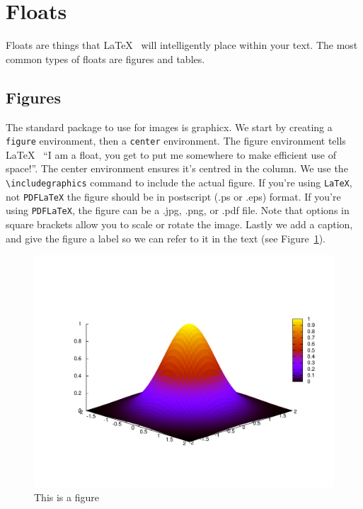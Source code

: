 \documentclass[twocolumn,10 pt,showpacs,preprintnumbers,amsmath,amssymb]{revtex4-1}
\begin{document}
\section*{Floats}

Floats are things that \LaTeX~ will intelligently place within your
text.  The most common types of floats are figures and tables.

\subsection{Figures}

The standard package to use for images is graphicx. We start by creating
a \texttt{figure} environment, then a \texttt{center} environment. The
figure environment tells \LaTeX~ ``I am a float, you get to put me
somewhere to make efficient use of space!''. The center environment
ensures it's centred in the column. We use the \verb_\includegraphics_
command to include the actual figure.  If you're using \texttt{LaTeX},
not \texttt{PDFLaTeX} the figure should be in postscript (.ps or .eps)
format.  If you're using \texttt{PDFLaTeX}, the figure can be a .jpg,
.png, or .pdf file.  Note that options in square brackets allow you to
scale or rotate the image.  Lastly we add a caption, and give the figure
a label so we can refer to it in the text (see Figure~\ref{fig:exp}).

\begin{figure}
  \centering
  \includegraphics[scale=0.25,angle=-90]{figure.pdf}
  \caption{This is a figure}
  \label{fig:exp}
\end{figure}
\end{document}
